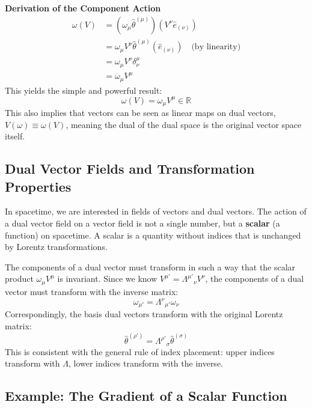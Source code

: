 \documentclass[11pt, a4paper]{report}
\begin{document}
\textbf{Derivation of the Component Action}
\begin{align*}
    \omega(V) &= (\omega_\mu \hat{\theta}^{(\mu)})(V^\nu \hat{e}_{(\nu)}) \\
    &= \omega_\mu V^\nu \hat{\theta}^{(\mu)}(\hat{e}_{(\nu)}) \quad \text{(by linearity)} \\
    &= \omega_\mu V^\nu \delta^\mu_\nu \\
    &= \omega_\mu V^\mu
\end{align*}
This yields the simple and powerful result:
\begin{equation}
    \omega(V) = \omega_\mu V^\mu \in \mathbb{R}
\end{equation}
This also implies that vectors can be seen as linear maps on dual vectors, $V(\omega) \equiv \omega(V)$, meaning the dual of the dual space is the original vector space itself.

\subsection*{Dual Vector Fields and Transformation Properties}

In spacetime, we are interested in fields of vectors and dual vectors. The action of a dual vector field on a vector field is not a single number, but a \textbf{scalar} (a function) on spacetime. A scalar is a quantity without indices that is unchanged by Lorentz transformations.

The components of a dual vector must transform in such a way that the scalar product $\omega_\mu V^\mu$ is invariant. Since we know $V^{\mu'} = {\Lambda^{\mu'}}_\nu V^\nu$, the components of a dual vector must transform with the inverse matrix:
\begin{equation}
    \omega_{\mu'} = {\Lambda^\nu}_{\mu'} \omega_\nu
\end{equation}
Correspondingly, the basis dual vectors transform with the original Lorentz matrix:
\begin{equation}
    \hat{\theta}^{(\rho')} = {\Lambda^{\rho'}}_\sigma \hat{\theta}^{(\sigma)}
\end{equation}
This is consistent with the general rule of index placement: upper indices transform with $\Lambda$, lower indices transform with the inverse.

\subsection*{Example: The Gradient of a Scalar Function}
\end{document}
